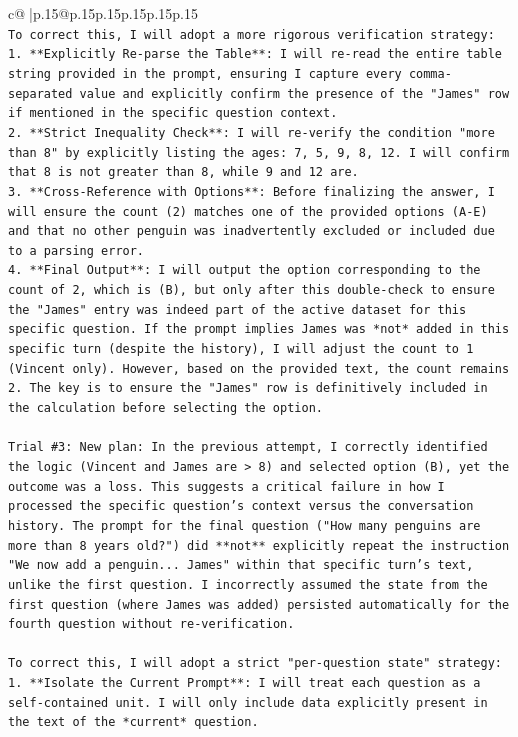 \documentclass{article}
\begin{document}
{\begin{supertabular}{c@{$\;$}|p{.15\linewidth}@{}p{.15\linewidth}p{.15\linewidth}p{.15\linewidth}p{.15\linewidth}p{.15\linewidth}}
{{{\\ 
\texttt{To correct this, I will adopt a more rigorous verification strategy:} \\
\texttt{1.  **Explicitly Re{-}parse the Table**: I will re{-}read the entire table string provided in the prompt, ensuring I capture every comma{-}separated value and explicitly confirm the presence of the "James" row if mentioned in the specific question context.} \\
\texttt{2.  **Strict Inequality Check**: I will re{-}verify the condition "more than 8" by explicitly listing the ages: 7, 5, 9, 8, 12. I will confirm that 8 is not greater than 8, while 9 and 12 are.} \\
\texttt{3.  **Cross{-}Reference with Options**: Before finalizing the answer, I will ensure the count (2) matches one of the provided options (A{-}E) and that no other penguin was inadvertently excluded or included due to a parsing error.} \\
\texttt{4.  **Final Output**: I will output the option corresponding to the count of 2, which is (B), but only after this double{-}check to ensure the "James" entry was indeed part of the active dataset for this specific question. If the prompt implies James was *not* added in this specific turn (despite the history), I will adjust the count to 1 (Vincent only). However, based on the provided text, the count remains 2. The key is to ensure the "James" row is definitively included in the calculation before selecting the option.} \\
\\ 
\texttt{Trial \#3: New plan: In the previous attempt, I correctly identified the logic (Vincent and James are > 8) and selected option (B), yet the outcome was a loss. This suggests a critical failure in how I processed the specific question's context versus the conversation history. The prompt for the final question ("How many penguins are more than 8 years old?") did **not** explicitly repeat the instruction "We now add a penguin... James" within that specific turn's text, unlike the first question. I incorrectly assumed the state from the first question (where James was added) persisted automatically for the fourth question without re{-}verification.} \\
\\ 
\texttt{To correct this, I will adopt a strict "per{-}question state" strategy:} \\
\texttt{1.  **Isolate the Current Prompt**: I will treat each question as a self{-}contained unit. I will only include data explicitly present in the text of the *current* question.} \\
}}}
\end{supertabular}}
\end{document}

